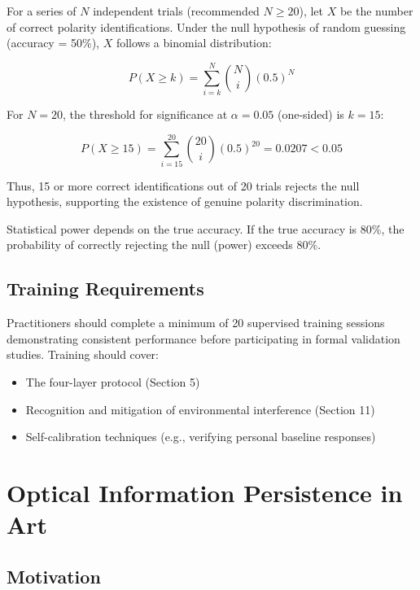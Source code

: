 \documentclass[12pt,a4paper]{article}
\begin{document}
For a series of \(N\) independent trials (recommended \(N \geq 20\)), let \(X\) be the number of correct polarity identifications. Under the null hypothesis of random guessing (accuracy = 50\%), \(X\) follows a binomial distribution:

\[
P(X \geq k) = \sum_{i=k}^{N} \binom{N}{i} (0.5)^N
\]

For \(N = 20\), the threshold for significance at \(\alpha = 0.05\) (one-sided) is \(k = 15\):

\[
P(X \geq 15) = \sum_{i=15}^{20} \binom{20}{i} (0.5)^{20} = 0.0207 < 0.05
\]

Thus, 15 or more correct identifications out of 20 trials rejects the null hypothesis, supporting the existence of genuine polarity discrimination.

Statistical power depends on the true accuracy. If the true accuracy is 80\%, the probability of correctly rejecting the null (power) exceeds 80\%.

\subsection{Training Requirements}

Practitioners should complete a minimum of 20 supervised training sessions demonstrating consistent performance before participating in formal validation studies. Training should cover:

\begin{itemize}
    \item The four-layer protocol (Section 5)
    \item Recognition and mitigation of environmental interference (Section 11)
    \item Self-calibration techniques (e.g., verifying personal baseline responses)
\end{itemize}


\section{Optical Information Persistence in Art}

\subsection{Motivation}
\end{document}
